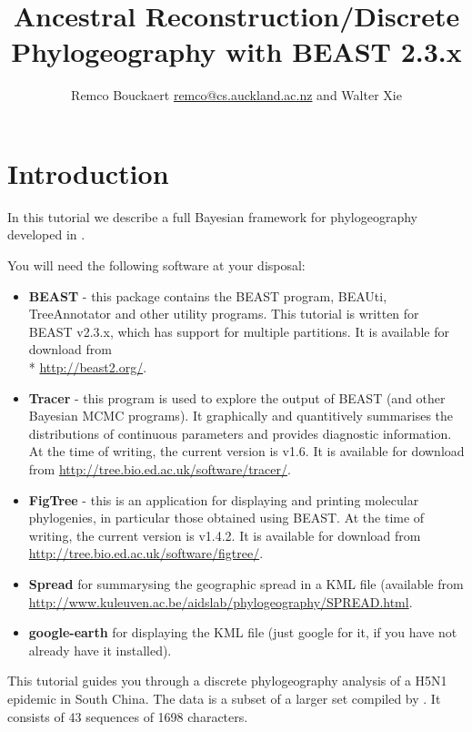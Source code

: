 \documentclass{article}
\newcommand{\BEASTVersion}{2.3.x}
\newcommand{\TracerVersion}{1.6}
\newcommand{\FigTreeVersion}{1.4.2}
\begin{document}
\title{Ancestral Reconstruction/Discrete Phylogeography with BEAST {\BEASTVersion}}
\author{Remco Bouckaert \url{remco@cs.auckland.ac.nz} and Walter Xie}
\maketitle

\section{Introduction}


In this tutorial we describe a full Bayesian framework for phylogeography developed in \cite{Lemey:2009uq}.

You will need the following software at your disposal:

\begin{itemize}

\item {\bf BEAST} - this package contains the BEAST program, BEAUti, TreeAnnotator and other utility programs. This tutorial is written for BEAST v{\BEASTVersion}, which has support for multiple partitions. It is available for download from \\* \url{http://beast2.org/}.
\item {\bf Tracer} - this program is used to explore the output of BEAST (and other Bayesian MCMC programs). It graphically and
quantitively summarises the distributions of continuous parameters and provides diagnostic information. At the time of
writing, the current version is v{\TracerVersion}. It is available for download from \url{http://tree.bio.ed.ac.uk/software/tracer/}.
\item {\bf FigTree} - this is an application for displaying and printing molecular phylogenies, in particular those obtained using
BEAST. At the time of writing, the current version is v{\FigTreeVersion}. It is available for download from \url{http://tree.bio.ed.ac.uk/software/figtree/}.
\item {\bf Spread} for summarysing the geographic spread in a KML file (available from \url{http://www.kuleuven.ac.be/aidslab/phylogeography/SPREAD.html}.
\item {\bf google-earth} for displaying the KML file (just google for it, if you have not already have it installed).
\end{itemize}


This tutorial guides you through a discrete phylogeography analysis of a H5N1 epidemic in South China.
The data is a subset of a larger set compiled by \cite{wallace:2007st}.
It consists of 43 sequences of 1698 characters.
\end{document}
